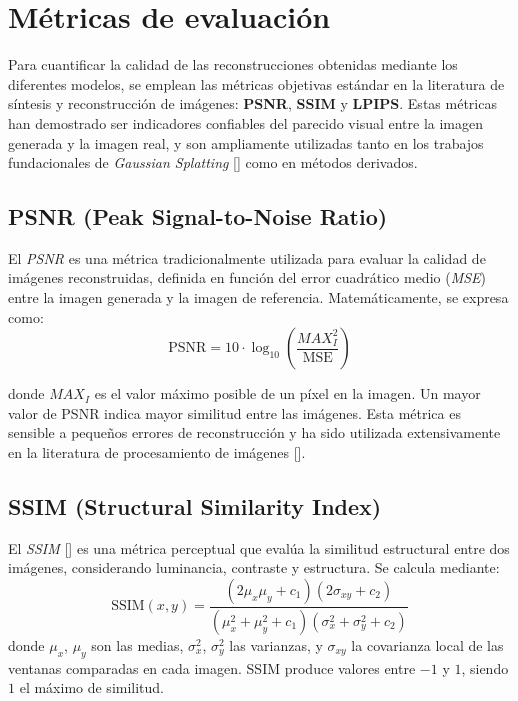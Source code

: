 \section{Métricas de evaluación}

Para cuantificar la calidad de las reconstrucciones obtenidas mediante los diferentes modelos, se emplean las métricas objetivas estándar en la literatura de síntesis y reconstrucción de imágenes: \textbf{PSNR}, \textbf{SSIM} y \textbf{LPIPS}. Estas métricas han demostrado ser indicadores confiables del parecido visual entre la imagen generada y la imagen real, y son ampliamente utilizadas tanto en los trabajos fundacionales de \emph{Gaussian Splatting} [\cite{kerbl20233d}] como en métodos derivados.

\subsection{PSNR (Peak Signal-to-Noise Ratio)}
El \emph{PSNR} es una métrica tradicionalmente utilizada para evaluar la calidad de imágenes reconstruidas, definida en función del error cuadrático medio (\emph{MSE}) entre la imagen generada y la imagen de referencia. Matemáticamente, se expresa como:
\begin{equation}
    \mathrm{PSNR} = 10 \cdot \log_{10} \left( \frac{MAX_I^2}{\mathrm{MSE}} \right)
\end{equation}  

donde $MAX_I$ es el valor máximo posible de un píxel en la imagen. Un mayor valor de PSNR indica mayor similitud entre las imágenes. Esta métrica es sensible a pequeños errores de reconstrucción y ha sido utilizada extensivamente en la literatura de procesamiento de imágenes [\cite{huynh2008scope}].

\subsection{SSIM (Structural Similarity Index)}
El \emph{SSIM} [\cite{wang2004image}] es una métrica perceptual que evalúa la similitud estructural entre dos imágenes, considerando luminancia, contraste y estructura. Se calcula mediante:
\begin{equation}
    \mathrm{SSIM}(x, y) = \frac{(2\mu_x\mu_y + c_1)(2\sigma_{xy} + c_2)}{(\mu_x^2 + \mu_y^2 + c_1)(\sigma_x^2 + \sigma_y^2 + c_2)}
\end{equation}
donde $\mu_x$, $\mu_y$ son las medias, $\sigma_x^2$, $\sigma_y^2$ las varianzas, y $\sigma_{xy}$ la covarianza local de las ventanas comparadas en cada imagen. SSIM produce valores entre $-1$ y $1$, siendo $1$ el máximo de similitud.

